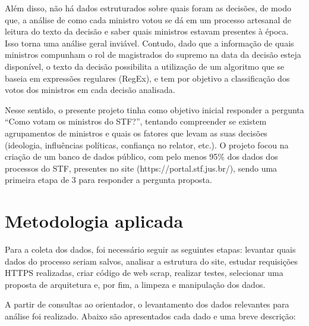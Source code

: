 Além disso, não há dados estruturados sobre quais foram as decisões, de modo que, a análise de como cada ministro votou se dá em um processo artesanal de leitura do texto da decisão e saber quais ministros estavam presentes à época. Isso torna uma análise geral inviável. Contudo, dado que a informação de quais ministros compunham o rol de magistrados do supremo na data da decisão esteja disponível, o texto da decisão possibilita a utilização de um algoritmo que se baseia em expressões regulares (RegEx), e tem por objetivo a classificação dos votos dos ministros em cada decisão analisada.

Nesse sentido, o presente projeto tinha como objetivo inicial responder a pergunta “Como votam os ministros do STF?”, tentando compreender se existem agrupamentos de ministros e quais os fatores que levam as suas decisões (ideologia, influências políticas, confiança no relator, etc.). O projeto focou na criação de um banco de dados público, com pelo menos 95\% dos dados dos processos do STF, presentes no site (https://portal.stf.jus.br/), sendo uma primeira etapa de 3 para responder a pergunta proposta. 

\section{Metodologia aplicada}

	Para a coleta dos dados, foi necessário seguir as seguintes etapas: levantar quais dados do processo seriam salvos, analisar a estrutura do site, estudar requisições HTTPS realizadas, criar código de web scrap, realizar testes, selecionar uma proposta de arquitetura e, por fim, a limpeza e manipulação dos dados. 

	A partir de consultas ao orientador, o levantamento dos dados relevantes para análise foi realizado. Abaixo são apresentados cada dado e uma breve descrição:
    
